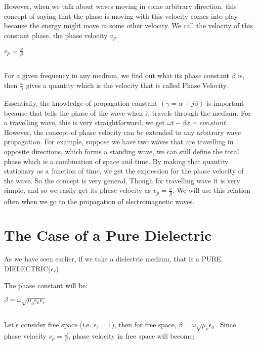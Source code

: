 However, when we talk about waves moving in some arbitrary direction, this concept of saying that the phase is moving with this velocity comes into play because the energy might move in some other velocity. We call the velocity of this constant phase, the phase velocity $ v_p $.

\begin{center}
$ v_p=\frac{\omega}{\beta} $
\end{center}
\begin{equation}\end{equation}

For a given frequency in any medium, we find out what its phase constant $\beta  $ is, then $\frac{\omega}{\beta}$ gives a quantity which is the velocity that is called Phase Velocity.

Essentially, the knowledge of propagation constant $(\gamma=\alpha+j\beta)$ is important because that tells the phase of the wave when it travels through the medium.
For a travelling wave, this is very straightforward, we get $ \omega t-\beta x=constant $. However, the concept of phase velocity can be extended to any arbitrary wave propagation. For example, suppose we have two waves that are travelling in opposite directions, which forms a standing wave, we can still define the total phase which is a combination of space and time. By making that quantity stationary as a function of time, we get the expression for the phase velocity of the wave. So the concept is very general, Though for travelling wave it is very simple, and so we easily get its phase velocity as $v_{p} = \frac{\omega}{\beta}.$ We will use this relation often when we go to the propagation of electromagnetic waves.

\section{\textbf{The Case of a Pure Dielectric}}

As we have seen earlier, if we take a dielectric medium, that is a PURE DIELECTRIC($\epsilon_{r}$)

The phase constant will be:

\begin{center}
$\beta=\omega\sqrt{\mu_{o}\epsilon_{o}\epsilon_{r}}$ 
\end{center}
\begin{equation}\end{equation}

Let's consider free space (i.e. $\epsilon_{r}=1 $), then for free space, $\beta=\omega\sqrt{\mu_{o}\epsilon_{o}}$.
Since phase velocity $v_p=\frac{\omega}{\beta}$, phase velocity in free space will become;

